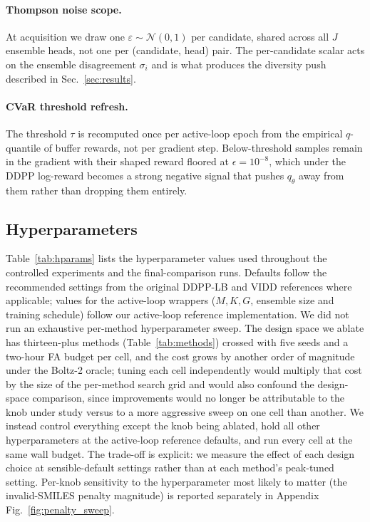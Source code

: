 \documentclass{article}
\begin{document}
\paragraph{Thompson noise scope.} At acquisition we draw one $\varepsilon \sim \mathcal{N}(0, 1)$ per candidate, shared across all $J$ ensemble heads, not one per (candidate, head) pair. The per-candidate scalar acts on the ensemble disagreement $\sigma_i$ and is what produces the diversity push described in Sec.~\ref{sec:results}.

\paragraph{CVaR threshold refresh.} The threshold $\tau$ is recomputed once per active-loop epoch from the empirical $q$-quantile of buffer rewards, not per gradient step. Below-threshold samples remain in the gradient with their shaped reward floored at $\epsilon = 10^{-8}$, which under the DDPP log-reward becomes a strong negative signal that pushes $q_\theta$ away from them rather than dropping them entirely.

\subsection{Hyperparameters}

Table~\ref{tab:hparams} lists the hyperparameter values used throughout the controlled experiments and the final-comparison runs. Defaults follow the recommended settings from the original DDPP-LB and VIDD references where applicable; values for the active-loop wrappers ($M, K, G$, ensemble size and training schedule) follow our active-loop reference implementation. We did not run an exhaustive per-method hyperparameter sweep. The design space we ablate has thirteen-plus methods (Table~\ref{tab:methods}) crossed with five seeds and a two-hour FA budget per cell, and the cost grows by another order of magnitude under the Boltz-2 oracle; tuning each cell independently would multiply that cost by the size of the per-method search grid and would also confound the design-space comparison, since improvements would no longer be attributable to the knob under study versus to a more aggressive sweep on one cell than another. We instead control everything except the knob being ablated, hold all other hyperparameters at the active-loop reference defaults, and run every cell at the same wall budget. The trade-off is explicit: we measure the effect of each design choice at sensible-default settings rather than at each method's peak-tuned setting. Per-knob sensitivity to the hyperparameter most likely to matter (the invalid-SMILES penalty magnitude) is reported separately in Appendix Fig.~\ref{fig:penalty_sweep}.
\end{document}
